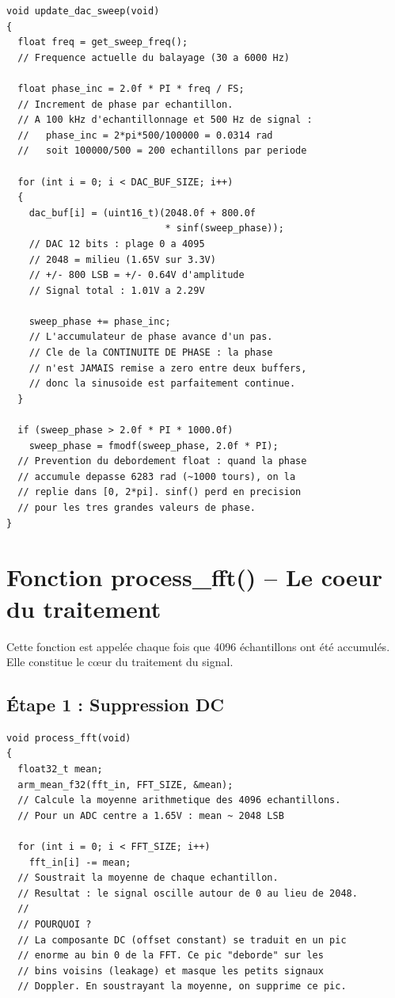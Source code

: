 \documentclass[a4paper,11pt]{article}
\begin{document}
\begin{lstlisting}[style=cstyle,caption={Remplissage du buffer DAC avec la sinuso\"ide}]
void update_dac_sweep(void)
{
  float freq = get_sweep_freq();
  // Frequence actuelle du balayage (30 a 6000 Hz)

  float phase_inc = 2.0f * PI * freq / FS;
  // Increment de phase par echantillon.
  // A 100 kHz d'echantillonnage et 500 Hz de signal :
  //   phase_inc = 2*pi*500/100000 = 0.0314 rad
  //   soit 100000/500 = 200 echantillons par periode

  for (int i = 0; i < DAC_BUF_SIZE; i++)
  {
    dac_buf[i] = (uint16_t)(2048.0f + 800.0f
                            * sinf(sweep_phase));
    // DAC 12 bits : plage 0 a 4095
    // 2048 = milieu (1.65V sur 3.3V)
    // +/- 800 LSB = +/- 0.64V d'amplitude
    // Signal total : 1.01V a 2.29V

    sweep_phase += phase_inc;
    // L'accumulateur de phase avance d'un pas.
    // Cle de la CONTINUITE DE PHASE : la phase
    // n'est JAMAIS remise a zero entre deux buffers,
    // donc la sinusoide est parfaitement continue.
  }

  if (sweep_phase > 2.0f * PI * 1000.0f)
    sweep_phase = fmodf(sweep_phase, 2.0f * PI);
  // Prevention du debordement float : quand la phase
  // accumule depasse 6283 rad (~1000 tours), on la
  // replie dans [0, 2*pi]. sinf() perd en precision
  // pour les tres grandes valeurs de phase.
}
\end{lstlisting}

\newpage

\section{Fonction process\_fft() -- Le coeur du traitement}

Cette fonction est appel\'ee chaque fois que 4096 \'echantillons ont \'et\'e accumul\'es. Elle constitue le c\oe ur du traitement du signal.

\subsection{\'Etape 1 : Suppression DC}

\begin{lstlisting}[style=cstyle,caption={Suppression de la composante continue}]
void process_fft(void)
{
  float32_t mean;
  arm_mean_f32(fft_in, FFT_SIZE, &mean);
  // Calcule la moyenne arithmetique des 4096 echantillons.
  // Pour un ADC centre a 1.65V : mean ~ 2048 LSB

  for (int i = 0; i < FFT_SIZE; i++)
    fft_in[i] -= mean;
  // Soustrait la moyenne de chaque echantillon.
  // Resultat : le signal oscille autour de 0 au lieu de 2048.
  //
  // POURQUOI ?
  // La composante DC (offset constant) se traduit en un pic
  // enorme au bin 0 de la FFT. Ce pic "deborde" sur les
  // bins voisins (leakage) et masque les petits signaux
  // Doppler. En soustrayant la moyenne, on supprime ce pic.
\end{lstlisting}
\end{document}
